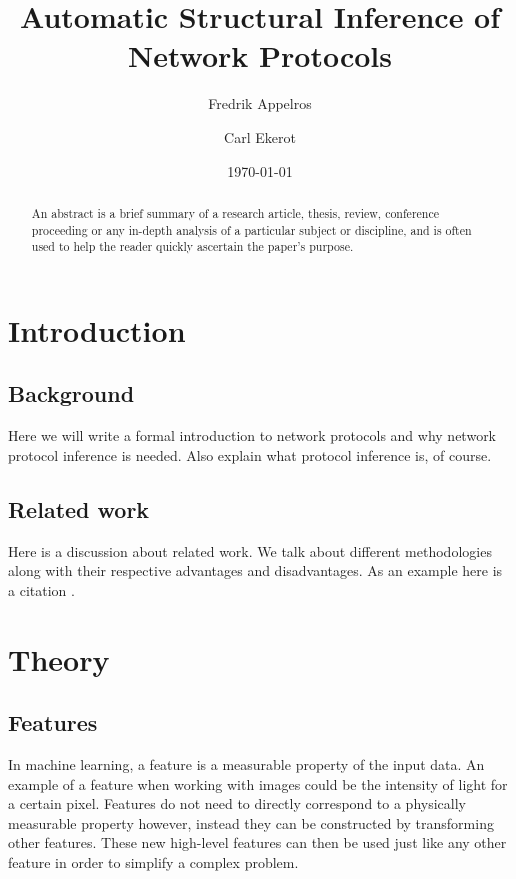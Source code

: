 \documentclass[a4paper]{report}
\begin{document}
\title{Automatic Structural Inference of Network Protocols}
\author{Fredrik Appelros \and Carl Ekerot}
\date{\today}
\maketitle

\begin{abstract}
An abstract is a brief summary of a research article, thesis, review,
conference proceeding or any in-depth analysis of a particular subject or
discipline, and is often used to help the reader quickly ascertain the paper's
purpose.
\end{abstract}

\tableofcontents

\chapter{Introduction}

\section{Background}
Here we will write a formal introduction to network protocols and why network
protocol inference is needed. Also explain what protocol inference is, of
course.

\section{Related work}
Here is a discussion about related work. We talk about different methodologies
along with their respective advantages and disadvantages. As an example here
is a citation \citep{cui07}.

\chapter{Theory}

\section{Features}
In machine learning, a feature is a measurable property of the input data. An
example of a feature when working with images could be the intensity of light
for a certain pixel. Features do not need to directly correspond to a
physically measurable property however, instead they can be constructed by
transforming other features. These new high-level features can then be used
just like any other feature in order to simplify a complex problem.
\end{document}

